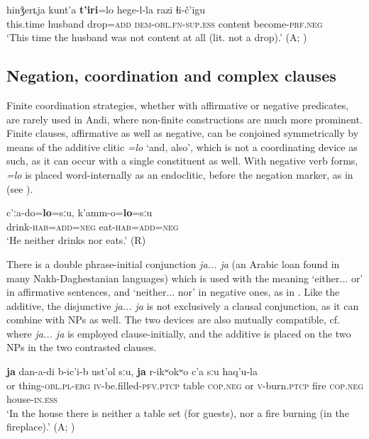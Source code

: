 \documentclass[output=paper,colorlinks=true, citecolor=brown]{langscibook}
\begin{document}
\ea
    \label{ex:and:74} 
    \gll hinǯerʟja kunt’a \textbf{t’iri}=lo hege{}-l{}-la razi ɬi{}-č’igu\\
          this.time husband drop=\textsc{add} \textsc{dem-obl.fn-sup.ess} content become-\textsc{prf.neg} \\
    \glt ‘This time the husband was not content at all (lit. not a drop).’ (A; )
\z

\subsection{Negation, coordination and complex clauses} \label{sec:and:4.5}

Finite coordination strategies, whether with affirmative or negative predicates, are rarely used in Andi, where non-finite constructions are much more prominent. Finite clauses, affirmative as well as negative, can be conjoined symmetrically by means of the additive clitic \textit{=lo} ‘and, also’, which is not a coordinating device as such, as it can occur with a single constituent as well. With negative verb forms, \textit{=lo} is placed word-internally as an endoclitic, before the negation marker, as in  (see ).

\ea
    \label{ex:and:75}
    \gll c’ːa-do=\textbf{lo}=sːu, k’amm{}-o=\textbf{lo}=sːu\\
          drink-\textsc{hab=add=neg} eat-\textsc{hab=add=neg} \\
    \glt ‘He neither drinks nor eats.’ (R)
\z 


There is a double phrase-initial conjunction \textit{ja... ja} (an Arabic loan found in many Nakh-Daghestanian languages) which is used with the meaning ‘either... or’ in affirmative sentences, and ‘neither... nor’ in negative ones, as in . Like the additive, the disjunctive \textit{ja... ja} is not exclusively a clausal conjunction, as it can combine with NPs as well. The two devices are also mutually compatible, cf.  where \textit{ja... ja} is employed clause-initially, and the additive is placed on the two NPs in the two contrasted clauses.

\ea
    \label{ex:and:76} 
    \gll \textbf{ja} dan{}-a{}-di b{}-ic’i{}-b ust’ol sːu, \textbf{ja} r-ikʷokʷo c’a sːu haq’u{}-la\\
          or thing{}-\textsc{obl}.\textsc{pl}{}-\textsc{erg} \textsc{iv}{}-be.filled-\textsc{pfv.ptcp} table \textsc{cop.neg} or \textsc{v}{}-burn.\textsc{ptcp} fire \textsc{cop.neg} house-\textsc{in.ess} \\
    \glt  ‘In the house there is neither a table set (for guests), nor a fire burning (in the fireplace).’ (A; )
\z 
\end{document}
